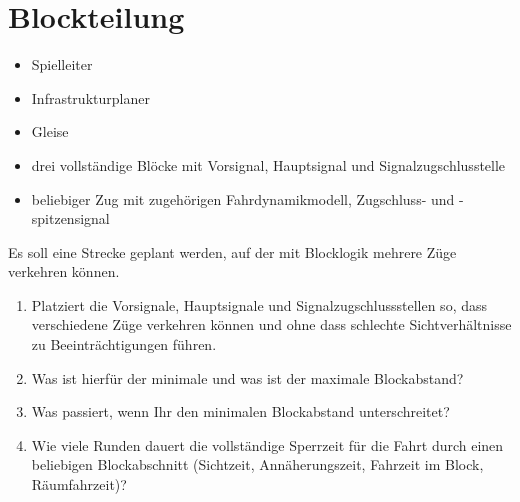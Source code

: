 

\section{Blockteilung}

  \roles
    \begin{itemize}
      \item Spielleiter
      \item Infrastrukturplaner
    \end{itemize}

  \material
    \begin{itemize}
      \item Gleise
      \item drei vollständige Blöcke mit Vorsignal, Hauptsignal und Signalzugschlusstelle
      \item beliebiger Zug mit zugehörigen Fahrdynamikmodell, Zugschluss- und -spitzensignal
    \end{itemize}

  \setup
    Es soll eine Strecke geplant werden, auf der mit Blocklogik mehrere Züge verkehren können.

  \task
    \begin{enumerate}[label=\alph*)]
      \item Platziert die Vorsignale, Hauptsignale und Signalzugschlussstellen so, dass verschiedene Züge verkehren können und ohne dass schlechte Sichtverhältnisse zu Beeinträchtigungen führen.
      \item Was ist hierfür der minimale und was ist der maximale Blockabstand?
      \item Was passiert, wenn Ihr den minimalen Blockabstand unterschreitet?
      \item Wie viele Runden dauert die vollständige Sperrzeit für die Fahrt durch einen beliebigen Blockabschnitt (Sichtzeit, Annäherungszeit, Fahrzeit im Block, Räumfahrzeit)?
    \end{enumerate}

